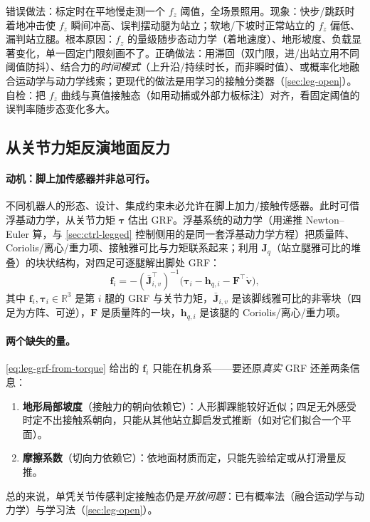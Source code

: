 \begin{pitfall}
错误做法：标定时在平地慢走测一个 $f_z$ 阈值，全场景照用。现象：快步/跳跃时着地冲击使 $f_z$ 瞬间冲高、误判摆动腿为站立；软地/下坡时正常站立的 $f_z$ 偏低、漏判站立腿。根本原因：$f_z$ 的量级随步态动力学（着地速度）、地形坡度、负载显著变化，单一固定门限刻画不了。正确做法：用滞回（双门限，进/出站立用不同阈值防抖）、结合力的\emph{时间模式}（上升沿/持续时长，而非瞬时值）、或概率化地融合运动学与动力学线索\cite{carlone2026handbook}；更现代的做法是用学习的接触分类器（\cref{sec:leg-open}）。自检：把 $f_z$ 曲线与真值接触态（如用动捕或外部力板标注）对齐，看固定阈值的误判率随步态变化多大。
\end{pitfall}

\subsection{从关节力矩反演地面反力}
\label{subsec:leg-grf}

\paragraph{动机：脚上加传感器并非总可行。}
不同机器人的形态、设计、集成约束未必允许在脚上加力/接触传感器。此时可借浮基动力学，从关节力矩 $\boldsymbol{\tau}$ 估出 GRF。浮基系统的动力学（用递推 Newton--Euler 算\cite{featherstone2008rigid}，与 \cref{sec:ctrl-legged} 控制侧用的是同一套浮基动力学方程）把质量阵、Coriolis/离心/重力项、接触雅可比与力矩联系起来；利用 $\mathbf{J}_q$（站立腿雅可比的堆叠）的块状结构，对四足可逐腿解出脚处 GRF：
\begin{equation}
  \mathbf{f}_i=-(\bar{\mathbf{J}}_{i,v}^\top)^{-1}\big(\boldsymbol{\tau}_i-\mathbf{h}_{q,i}-\mathbf{F}^\top\dot{\mathbf{v}}\big),
  \label{eq:leg-grf-from-torque}
\end{equation}
其中 $\mathbf{f}_i,\boldsymbol{\tau}_i\in\mathbb{R}^3$ 是第 $i$ 腿的 GRF 与关节力矩，$\bar{\mathbf{J}}_{i,v}$ 是该脚线雅可比的非零块（四足为方阵、可逆），$\mathbf{F}$ 是质量阵的一块，$\mathbf{h}_{q,i}$ 是该腿的 Coriolis/离心/重力项。

\paragraph{两个缺失的量。}
\cref{eq:leg-grf-from-torque} 给出的 $\mathbf{f}_i$ 只能在机身系——要还原\emph{真实} GRF 还差两条信息：
\begin{enumerate}
  \item \textbf{地形局部坡度}（接触力的朝向依赖它）：人形脚踝能较好近似；四足无外感受时定不出接触系朝向，只能从其他站立脚启发式推断（如对它们拟合一个平面）。
  \item \textbf{摩擦系数}（切向力依赖它）：依地面材质而定，只能先验给定或从打滑量反推\cite{carlone2026handbook}。
\end{enumerate}
总的来说，单凭关节传感判定接触态仍是\emph{开放问题}：已有概率法（融合运动学与动力学）与学习法（\cref{sec:leg-open}）。


